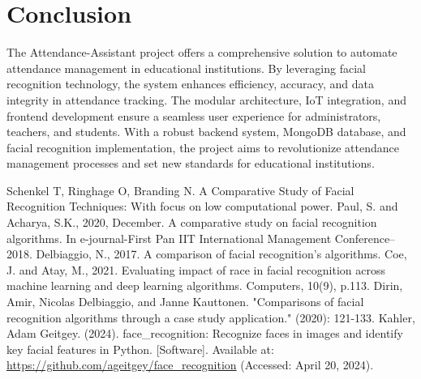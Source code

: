 \documentclass[conference]{IEEEtran}
\begin{document}
\section{Conclusion}
The Attendance-Assistant project offers a comprehensive solution to automate attendance management in educational institutions. By leveraging facial recognition technology, the system enhances efficiency, accuracy, and data integrity in attendance tracking. The modular architecture, IoT integration, and frontend development ensure a seamless user experience for administrators, teachers, and students. With a robust backend system, MongoDB database, and facial recognition implementation, the project aims to revolutionize attendance management processes and set new standards for educational institutions.

\begin{thebibliography}{00}
    Schenkel T, Ringhage O, Branding N. A Comparative Study of Facial Recognition Techniques: With focus on low computational power.
    Paul, S. and Acharya, S.K., 2020, December. A comparative study on facial recognition algorithms. In e-journal-First Pan IIT International Management Conference–2018.
    Delbiaggio, N., 2017. A comparison of facial recognition’s algorithms.
    Coe, J. and Atay, M., 2021. Evaluating impact of race in facial recognition across machine learning and deep learning algorithms. Computers, 10(9), p.113.
    Dirin, Amir, Nicolas Delbiaggio, and Janne Kauttonen. "Comparisons of facial recognition algorithms through a case study application." (2020): 121-133.
    Kahler, Adam Geitgey. (2024). face\_recognition: Recognize faces in images and identify key facial features in Python. [Software]. Available at: \url{https://github.com/ageitgey/face_recognition} (Accessed: April 20, 2024).

\end{thebibliography}
\end{document}
